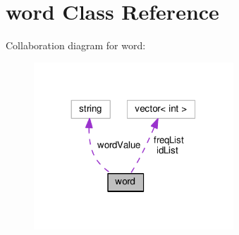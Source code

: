 \section{word Class Reference}
\label{classword}


Collaboration diagram for word\+:\nopagebreak
\begin{figure}[H]
\begin{center}
\leavevmode
\includegraphics[width=212pt]{classword__coll__graph}
\end{center}
\end{figure}
